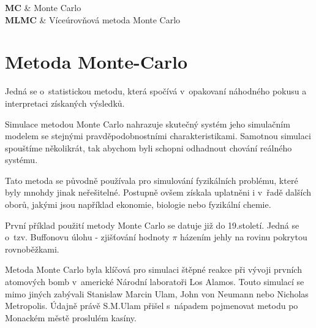 \documentclass[FM, RP]{tulthesis}
\begin{document}

\tableofcontents
\clearpage
\begin{abbrList}
\textbf{MC} & Monte Carlo \\
\textbf{MLMC} & Víceúrovňová metoda Monte Carlo \\
\end{abbrList}

\chapter{Metoda Monte-Carlo}

Jedná se o~statistickou metodu, která spočívá v~opakovaní náhodného pokusu a interpretaci získaných výsledků.

Simulace metodou Monte Carlo nahrazuje skutečný systém jeho simulačním modelem se stejnými pravděpodobnostními charakteristikami. Samotnou simulaci spouštíme několikrát, tak abychom byli schopni odhadnout chování reálného systému.
\newline

Tato metoda se původně používala pro simulování fyzikálních problému, které byly mnohdy jinak neřešitelné. Postupně ovšem získala uplatněni i v~řadě dalších oborů, jakými jsou například ekonomie, biologie nebo fyzikální chemie.

První příklad použití metody Monte Carlo se datuje již do 19.století. Jedná se o~tzv. Buffonovu úlohu - zjišťování hodnoty $\pi$ házením jehly na rovinu pokrytou rovnoběžkami.

Metoda Monte Carlo byla klíčová pro simulaci štěpné reakce při vývoji prvních atomových bomb v~americké Národní laboratoři Los Alamos. Touto simulací se mimo jiných zabývali Stanislaw Marcin Ulam, John von Neumann nebo Nicholas Metropolis. Údajně právě S.M.Ulam přišel s~nápadem pojmenovat metodu po Monackém městě proslulém kasíny.
\newline




\end{document}
